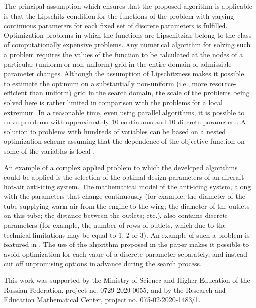 \documentclass[
11pt,%
tightenlines,%
twoside,%
onecolumn,%
nofloats,%
nobibnotes,%
nofootinbib,%
superscriptaddress,%
noshowpacs,%
centertags]%
{revtex4}
\begin{document}
The principal assumption which ensures that the proposed algorithm is applicable is that the Lipschitz condition for the functions of the problem with varying continuous parameters for each fixed set of discrete parameters is fulfilled.
Optimization problems in which the functions are Lipschitzian belong to the class of computationally expensive problems. Any numerical algorithm for solving such a problem requires the values of the function to be calculated at the nodes of a particular (uniform or non-uniform) grid in the entire domain of admissible parameter changes.
Although the assumption of Lipschitzness makes it possible to estimate the optimum on a substantially non-uniform (i.e., more resource-efficient than uniform) grid in the search domain, the scale of the problems being solved here is rather limited in comparison with the problems for a local extremum. In a reasonable time, even using parallel algorithms, it is possible to solve problems with approximately 10 continuous and 10 discrete parameters. 
A solution to problems with hundreds of variables can be based on a nested optimization scheme assuming that the dependence of the objective function on some of the variables is local \cite{Barkalov2020_1}.

An example of a complex applied problem to which the developed algorithms could be applied is the selection of the optimal design parameters of an aircraft hot-air anti-icing system. The mathematical model of the anti-icing system, along with the parameters that change continuously (for example, the diameter of the tube supplying warm air from the engine to the wing; the diameter of the outlets on this tube; the distance between the outlets; etc.), also contains discrete parameters (for example, the number of rows of outlets, which due to the technical limitations may be equal to 1, 2 or 3). An example of such a problem is featured in \cite{Habashi}. The use of the algorithm proposed in the paper makes it possible to avoid optimization for each value of a discrete parameter separately, and instead cut off unpromising options in advance during the search process.
 


\begin{acknowledgments}
This work was supported by the Ministry of Science and Higher Education of the Russian Federation, project no. 0729-2020-0055, and by the Research and Education Mathematical Center, project no. 075-02-2020-1483/1.
\end{acknowledgments}
\end{document}
